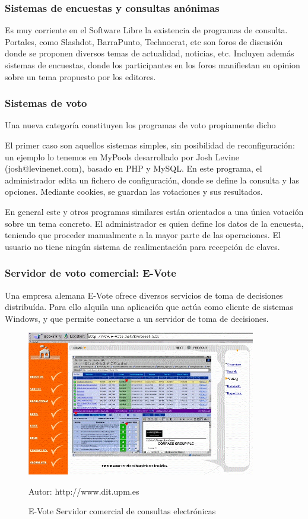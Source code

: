 \subsubsection{Sistemas de encuestas y consultas anónimas}
Es muy corriente en el Software Libre la existencia de programas de consulta. Portales, como Slashdot, BarraPunto, Technocrat, etc son foros de discusión donde se proponen diversos temas de actualidad, noticias, etc. Incluyen además sistemas de encuestas, donde los participantes en los foros manifiestan su opinion sobre un tema propuesto por los editores.

\subsubsection{Sistemas de voto}
Una nueva categoría constituyen los programas de voto propiamente dicho

El primer caso son aquellos sistemas simples, sin posibilidad de reconfiguración: un ejemplo lo tenemos en MyPools desarrollado por Josh Levine (josh@levinenet.com), basado en PHP y MySQL. En este programa, el administrador edita un fichero de configuración, donde se define la consulta y las opciones. Mediante cookies, se guardan las votaciones y sus resultados.

En general este y otros programas similares están orientados a una única votación sobre un tema concreto. El administrador es quien define los datos de la encuesta, teniendo que proceder manualmente a la mayor parte de las operaciones. El usuario no tiene ningún sistema de realimentación para recepción de claves.

\subsubsection*{Servidor de voto comercial: E-Vote}

Una empresa alemana E-Vote ofrece diversos servicios de toma de decisiones distribuída.  Para ello alquila una aplicación que actúa como cliente de sistemas Windows, y que permite conectarse a un servidor de toma de decisiones.

\begin{figure}[h!]

\centering
\includegraphics[width=10cm]{Figuras/evotenet.jpg}
\caption{E-Vote Servidor comercial de consultas electrónicas }
Autor: http://www.dit.upm.es
\end{figure}

